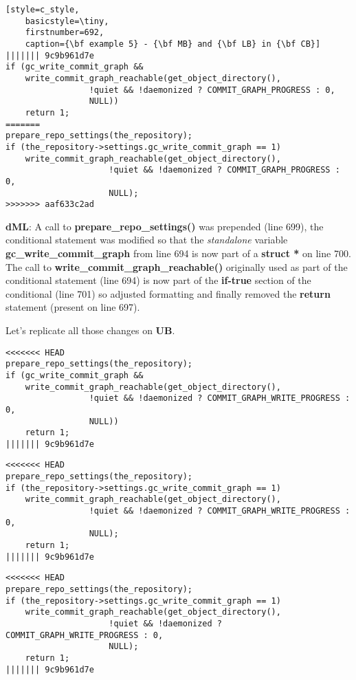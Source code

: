 \begin{lstlisting}[style=c_style,
	basicstyle=\tiny,
	firstnumber=692,
	caption={\bf example 5} - {\bf MB} and {\bf LB} in {\bf CB}]
||||||| 9c9b961d7e
if (gc_write_commit_graph &&
    write_commit_graph_reachable(get_object_directory(),
				 !quiet && !daemonized ? COMMIT_GRAPH_PROGRESS : 0,
				 NULL))
	return 1;
=======
prepare_repo_settings(the_repository);
if (the_repository->settings.gc_write_commit_graph == 1)
	write_commit_graph_reachable(get_object_directory(),
				     !quiet && !daemonized ? COMMIT_GRAPH_PROGRESS : 0,
				     NULL);
>>>>>>> aaf633c2ad
\end{lstlisting}

{\bf dML}: A call to {\bf prepare\_repo\_settings()} was prepended (line 699), the conditional statement was modified
so that the {\it standalone} variable {\bf gc\_write\_commit\_graph} from line 694 is now part of a {\bf struct * } on
line 700. The call to {\bf write\_commit\_graph\_reachable()} originally used as part of the conditional statement (line 694) is
now part of the {\bf if-true} section of the conditional (line 701) so adjusted formatting and finally removed the {\bf return}
statement (present on line 697).

Let's replicate all those changes on {\bf UB}.

\begin{lstlisting}[style=c_style,
	basicstyle=\tiny,
	firstnumber=686,
	caption={\bf example 5} - Step 1 - Prepend call]
<<<<<<< HEAD
prepare_repo_settings(the_repository);
if (gc_write_commit_graph &&
    write_commit_graph_reachable(get_object_directory(),
				 !quiet && !daemonized ? COMMIT_GRAPH_WRITE_PROGRESS : 0,
				 NULL))
	return 1;
||||||| 9c9b961d7e
\end{lstlisting}

\begin{lstlisting}[style=c_style,
	basicstyle=\tiny,
	firstnumber=686,
	caption={\bf example 5} - Step 2 - adjust conditional]
<<<<<<< HEAD
prepare_repo_settings(the_repository);
if (the_repository->settings.gc_write_commit_graph == 1)
    write_commit_graph_reachable(get_object_directory(),
				 !quiet && !daemonized ? COMMIT_GRAPH_WRITE_PROGRESS : 0,
				 NULL);
	return 1;
||||||| 9c9b961d7e
\end{lstlisting}

\begin{lstlisting}[style=c_style,
	basicstyle=\tiny,
	firstnumber=686,
	caption={\bf example 5} - Step 3 - adjust formatting]
<<<<<<< HEAD
prepare_repo_settings(the_repository);
if (the_repository->settings.gc_write_commit_graph == 1)
	write_commit_graph_reachable(get_object_directory(),
				     !quiet && !daemonized ? COMMIT_GRAPH_WRITE_PROGRESS : 0,
				     NULL);
	return 1;
||||||| 9c9b961d7e
\end{lstlisting}

